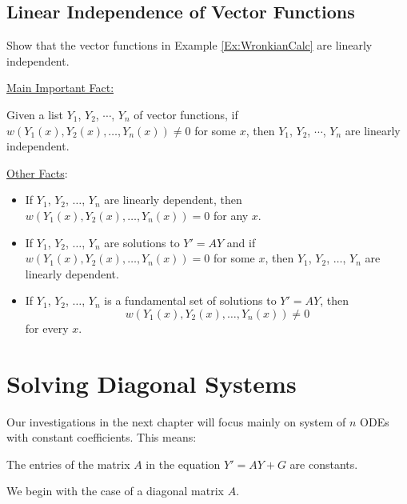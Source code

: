\documentclass[12pt,a4paper]{article}
\newcounter{example}[section]
\begin{document}
	
	\newpage
	
	\subsection{Linear Independence of Vector Functions}
	
	\begin{example}
	Show that the vector functions in Example \ref{Ex:WronkianCalc} are linearly independent.
	\end{example}
	
	\newpage
	
	\phantom{2}
	
	\vfill
	
	\underline{Main Important Fact:}
	
	Given a list $Y_1$, $Y_2$, $\cdots$, $Y_n$ of vector functions, if $w (Y_1 (x) , Y_2 (x) , \ldots , Y_n (x)) \neq 0$ for some $x$, then $Y_1$, $Y_2$, $\cdots$, $Y_n$ are linearly independent.
	
	\vspace*{14pt}
	
	\underline{Other Facts}:
		\begin{itemize}
		\item If $Y_1$, $Y_2$, $\ldots$, $Y_n$ are linearly dependent, then $w (Y_1 (x) , Y_2 (x) , \ldots , Y_n (x)) = 0$ for any $x$.
		\item If $Y_1$, $Y_2$, $\ldots$, $Y_n$ are solutions to $Y' = AY$ and if $w (Y_1(x) , Y_2(x) , \ldots , Y_n (x)) = 0$ for some $x$, then $Y_1$, $Y_2$, $\ldots$, $Y_n$ are linearly dependent.
		\item If $Y_1$, $Y_2$, $\ldots$, $Y_n$ is a fundamental set of solutions to $Y' = AY$, then 
		$$
		w(Y_1(x) , Y_2 (x) , \ldots , Y_n (x) ) \neq 0
		$$
	for every $x$.
		\end{itemize}
		
\newpage

\section{Solving Diagonal Systems}
Our investigations in the next chapter will focus mainly on system of $n$ ODEs with constant coefficients. This means:
	\begin{center}
	The entries of the matrix $A$ in the equation $Y' = AY + G$ are constants.
	\end{center}
	
We begin with the case of a diagonal matrix $A$.

\vspace*{14pt}
\end{document}
